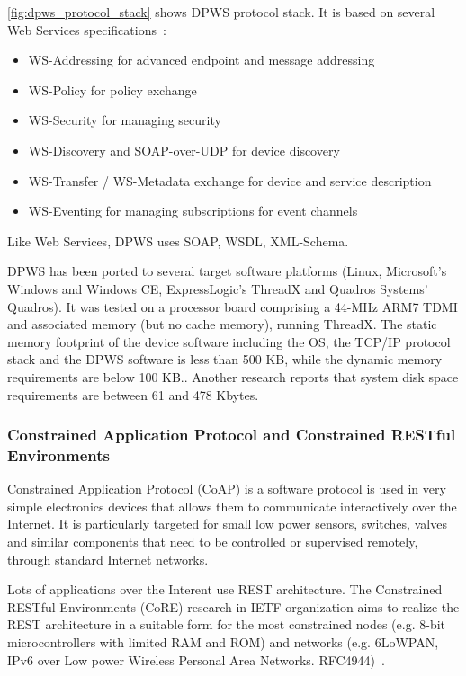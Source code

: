 \autoref{fig:dpws_protocol_stack} shows DPWS protocol stack. It is based on  
several Web Services specifications~\cite{ws4d_dpws}:
\begin{itemize}
  \item WS-Addressing for advanced endpoint and message addressing
  \item WS-Policy for policy exchange
  \item WS-Security for managing security
  \item WS-Discovery and SOAP-over-UDP for device discovery
  \item WS-Transfer / WS-Metadata exchange for device and service description
  \item WS-Eventing for managing subscriptions for event channels   
\end{itemize}
    
Like Web Services, DPWS uses SOAP, WSDL, XML-Schema. 


DPWS has been ported to several target software
platforms (Linux, Microsoft's Windows and Windows CE,
ExpressLogic's ThreadX and Quadros Systems' Quadros).
It was tested on a processor board comprising a 44-MHz ARM7
TDMI and associated memory (but no cache memory), running
ThreadX. The static memory footprint of the device software including
the OS, the TCP/IP protocol stack and the DPWS software is
less than 500 KB, while the dynamic memory requirements are
below 100 KB.\cite{4221180}.    
Another research \cite{5470528} reports that system disk space
requirements are between 61 and 478 Kbytes. 



\subsubsection{Constrained Application Protocol and Constrained RESTful Environments}
\label{sec:CoAP}

Constrained Application Protocol (CoAP) is a software protocol is
used in very simple electronics devices that allows them to communicate interactively over the Internet.
It is particularly targeted for small low power sensors, switches,
valves and similar components that need to be controlled or supervised remotely, through standard Internet networks.

Lots of applications over the Interent use REST architecture.
   The Constrained RESTful Environments (CoRE) research in IETF organization
   aims to realize the REST architecture in a suitable form for the most
   constrained nodes (e.g.  8-bit microcontrollers with limited RAM and ROM) and
   networks (e.g.  6LoWPAN, IPv6 over Low power Wireless Personal Area
   Networks. RFC4944)~\cite{coap_spec}.

